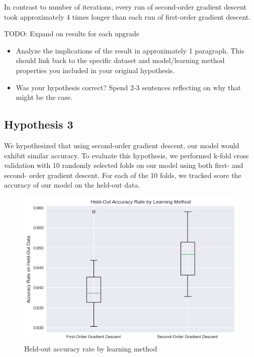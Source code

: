 \documentclass[11pt]{extarticle}
\begin{document}
In contrast to number of iterations, every run of second-order gradient descent took approximately 4 times longer than each run of first-order gradient descent.

TODO: Expand on results for each upgrade

\begin{itemize}
 \item Analyze the implications of the result in approximately 1 paragraph.  This should link back to the specific dataset and model/learning method properties you included in your original hypothesis.  
 \item Was your hypothesis correct?  Spend 2-3 sentences reflecting on why that might be the case.
\end{itemize}

\newpage

\subsection{Hypothesis 3}

We hypothesized that using second-order gradient descent, our model would exhibit similar accuracy. To evaluate this hypothesis, we performed k-fold cross validation with 10 randomly selected folds on our model using both first- and second- order gradient descent. For each of the 10 folds, we tracked score the accuracy of our model on the held-out data.

\begin{figure}[h!]
\begin{center}
    \includegraphics[scale=.7]{accuracy.png}
    \caption{Held-out accuracy rate by learning method}
    \label{fig:x}
\end{center}
\end{figure}
\end{document}
